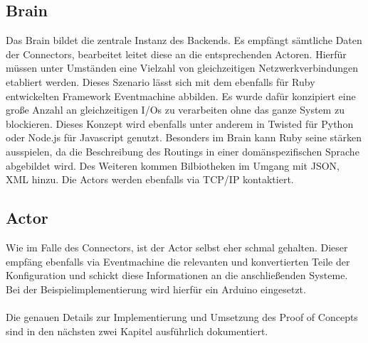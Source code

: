 \subsection{Brain}

Das Brain bildet die zentrale Instanz des Backends. Es empfängt sämtliche Daten der Connectors, bearbeitet leitet diese an die entsprechenden Actoren. Hierfür müssen unter Umständen eine Vielzahl von gleichzeitigen Netzwerkverbindungen etabliert werden. Dieses Szenario lässt sich mit dem ebenfalls für Ruby entwickelten Framework Eventmachine abbilden. Es wurde dafür konzipiert eine große Anzahl an gleichzeitigen I/Os zu verarbeiten ohne das ganze System zu blockieren. Dieses Konzept wird ebenfalls unter anderem in Twisted für Python oder Node.js für Javascript genutzt. Besonders im Brain kann Ruby seine stärken ausspielen, da die Beschreibung des Routings in einer domänspezifischen Sprache abgebildet wird. Des Weiteren kommen Bilbiotheken im Umgang mit JSON, XML hinzu. Die Actors werden ebenfalls via TCP/IP kontaktiert. 

\subsection{Actor} 
Wie im Falle des Connectors, ist der Actor selbst eher schmal gehalten. Dieser empfäng ebenfalls via Eventmachine die relevanten und konvertierten Teile der Konfiguration und schickt diese Informationen an die anschließenden Systeme. Bei der Beispielimplementierung wird hierfür ein Arduino eingesetzt. 
\\\\
Die genauen Details zur Implementierung und Umsetzung des Proof of Concepts sind in den nächsten zwei Kapitel ausführlich dokumentiert. 






